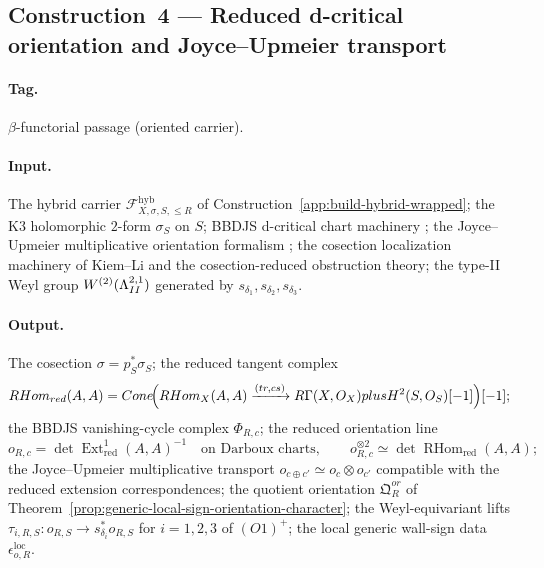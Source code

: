 \subsection{Construction~4 — Reduced d-critical orientation
and Joyce--Upmeier transport}
\label{app:build-orientation}

\paragraph{Tag.} \(\beta\)-functorial passage (oriented carrier).

\paragraph{Input.}
The hybrid carrier
\(\mathcal F_{X,\sigma,S,\le R}^{\mathrm{hyb}}\) of
Construction~\ref{app:build-hybrid-wrapped}; the K3 holomorphic
\(2\)-form \(\sigma_S\) on \(S\); BBDJS d-critical chart machinery
\cite{BBDJS2015}; the Joyce--Upmeier multiplicative orientation
formalism \cite{JoyceUpmeier,JoyceTanakaUpmeier}; the cosection
localization machinery of Kiem--Li and the cosection-reduced
obstruction theory; the type-II Weyl group
\(W^{(2)}(\La^{2,1}_{II})\) generated by
\(s_{\delta_1},s_{\delta_2},s_{\delta_3}\).

\paragraph{Output.}
The cosection
\(\sigma=p_S^*\sigma_S\); the reduced tangent complex
\[
\operatorname{RHom}_{\mathrm{red}}(A,A)
=
\operatorname{Cone}\!\Bigl(
\operatorname{RHom}_X(A,A)
\xrightarrow{(\mathrm{tr},\mathrm{cs})}
R\Gamma(X,\mathcal O_X)\oplus H^2(S,\mathcal O_S)[-1]
\Bigr)[-1];
\]
the BBDJS vanishing-cycle complex \(\Phi_{R,c}\); the reduced
orientation line
\[
o_{R,c}
=\det\operatorname{Ext}^1_{\mathrm{red}}(A,A)^{-1}
\quad\text{on Darboux charts},\qquad
o_{R,c}^{\otimes 2}\simeq\det\operatorname{RHom}_{\mathrm{red}}(A,A);
\]
the Joyce--Upmeier multiplicative transport
\(o_{c\oplus c'}\simeq o_c\otimes o_{c'}\) compatible with the reduced
extension correspondences; the quotient orientation
\(\mathfrak Q^{or}_R\) of
Theorem~\ref{prop:generic-local-sign-orientation-character}; the
Weyl-equivariant lifts
\(\tau_{i,R,S}:o_{R,S}\to s_{\delta_i}^*o_{R,S}\) for \(i=1,2,3\) of
\((O1)^+\); the local generic wall-sign data \(\epsilon_{o,R}^{\mathrm{loc}}\).

